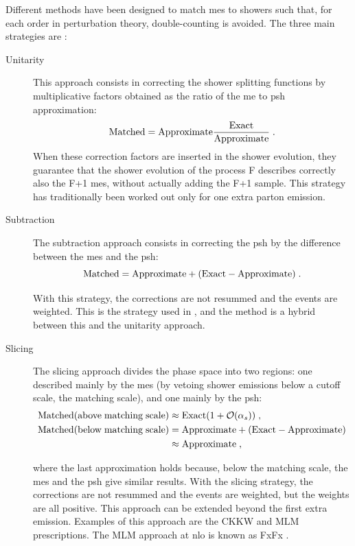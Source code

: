 Different methods have been designed to match \glspl{me} to showers such that, for each order in perturbation theory, double-counting is avoided. The three main strategies are \cite{Giele:2011cb}:
\begin{description}
\item[Unitarity] This approach consists in correcting the shower splitting functions by multiplicative factors obtained as the ratio of the \gls{me} to \gls{psh} approximation:
$$
\rm{Matched} = \rm{Approximate}\frac{\rm{Exact}}{Approximate} \; .
$$
\noindent When these correction factors are inserted in the shower evolution, they guarantee that the shower evolution of the process F describes correctly also the F+1 \glspl{me}, without actually adding the F+1 sample. This strategy has traditionally been worked out only for one extra parton emission. 

\item[Subtraction] The subtraction approach consists in correcting the \gls{psh} by the difference between the \glspl{me} and the \gls{psh}:
$$
\rm{Matched} = \rm{Approximate} + (\rm{Exact}- \rm{Approximate}) \; .
$$

\noindent With this strategy, the corrections are not resummed and the events are weighted. This is the strategy used in \mcatnlo \cite{Frixione:2002ik,Frixione:2003ei,Frixione:2008ym}, and the \Powheg method \cite{Frixione:2007vw} is a hybrid between this and the unitarity approach.

\item[Slicing] The slicing approach divides the phase space into two regions: one described mainly by the \glspl{me} (by vetoing shower emissions below a cutoff scale, the matching scale), and one mainly by the \gls{psh}:
\begin{equation*}
\begin{split}
 {\rm{Matched (above \; matching \;  scale)}} &\approx {\rm{Exact}} (1 + {\mathcal{O}} ( \alpha_s)) \; , \\
{\rm{Matched (below \; matching \;  scale)} } &= {\rm{Approximate}} + ({\rm{Exact}}- {\rm{Approximate}})  \\
& \approx {\rm{Approximate}}    \; , \nonumber
\end{split}
\end{equation*}


\noindent where the last approximation holds because, below the matching scale, the \glspl{me} and the \gls{psh} give similar results. 
With the slicing strategy, the corrections are not resummed and the events are weighted, but the weights are all positive. This approach can be extended beyond the first extra emission. 
Examples of this approach are the CKKW \cite{Catani:2001cc} and MLM \cite{Mangano:2006rw,Mrenna:2003if} prescriptions. The MLM approach at \gls{nlo} is known as FxFx \cite{Frederix:2012ps}. 

\end{description}


